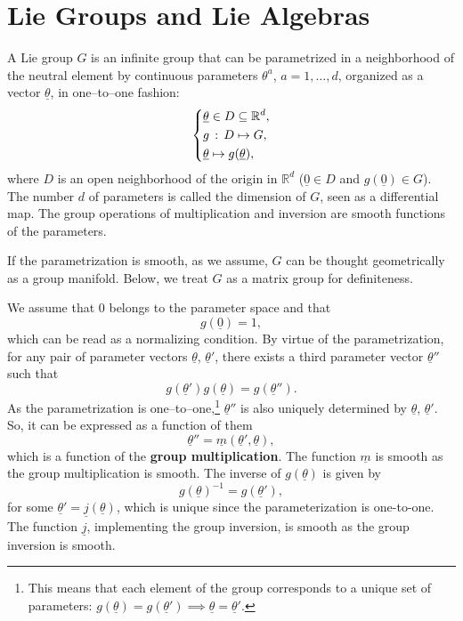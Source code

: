 \section{Lie Groups and Lie Algebras} \label{sec:lie}

A Lie group \(G\) is an infinite group that can be parametrized in a neighborhood of the neutral element by continuous parameters \(\theta^a\), \(a = 1, \ldots, d\), organized as a vector \(\underline{\theta}\), in one–to–one fashion:
\[
    \begin{dcases}
        \underline{\theta} \in D \subseteq \mathbb{R}^d, \\
        g \, : \, D \mapsto G,                           \\
        \underline{\theta} \mapsto g(\underline{\theta}),
    \end{dcases}
\]
where \(D\) is an open neighborhood of the origin in \(\mathbb{R}^d\) (\(\underline{0}\in D\) and \(g(\underline{0}) \in G\)). The number \(d\) of parameters is called the dimension of \(G\), seen as a differential map. The group operations of multiplication and inversion are smooth functions of the parameters.

If the parametrization is smooth, as we assume, \(G\) can be thought geometrically as a group manifold. Below, we treat \(G\) as a matrix group for definiteness.

We assume that 0 belongs to the parameter space and that
\[
    g(\underline{0}) = 1,
\]
which can be read as a normalizing condition. By virtue of the parametrization, for any pair of parameter vectors \(\underline{\theta}\), \(\underline{\theta}'\), there exists a third parameter vector \(\underline{\theta}''\) such that
\[
    g(\underline{\theta}') g(\underline{\theta}) = g(\underline{\theta}'').
\]
As the parametrization is one–to–one,\footnote{This means that each element of the group corresponds to a unique set of parameters: \(g(\underline{\theta})=g(\underline{\theta}') \implies \underline{\theta} = \underline{\theta}'\).} \(\underline{\theta}''\) is also uniquely determined by \(\underline{\theta}\), \(\underline{\theta}'\).
So, it can be expressed as a function of them
\[
    \underline{\theta}'' = \underline{m}(\underline{\theta}', \underline{\theta}),
\]
which is a function of the \textbf{group multiplication}. The function \(\underline{m}\) is smooth as the group multiplication is smooth. The inverse of \(g(\underline{\theta})\) is given by
\[
    g(\underline{\theta})^{-1} = g(\underline{\theta}'),
\]
for some \(\underline{\theta}' = \underline{j}(\underline{\theta})\), which is unique since the parameterization is one-to-one. The function \(\underline{j}\), implementing the group inversion, is smooth as the group inversion is smooth.


